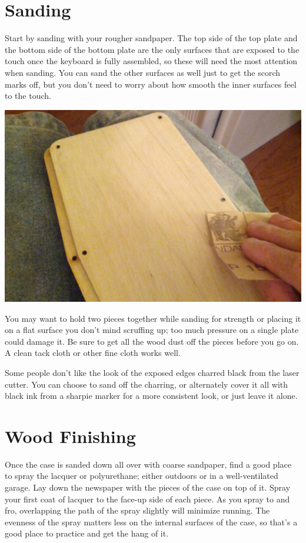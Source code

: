 \documentclass[landscape,twocolumn]{article}
\begin{document}
\section{Sanding}

Start by sanding with your rougher sandpaper. The top side of the
top plate and the bottom side of the bottom plate are the only
surfaces that are exposed to the touch once the keyboard is fully
assembled, so these will need the most attention when sanding. You can
sand the other surfaces as well just to get the scorch marks off, but
you don't need to worry about how smooth the inner surfaces feel to
the touch.

\vspace{1em}
\begin{center}
  \includegraphics[width=0.7\columnwidth]{sanding.jpg}
\end{center}
\vspace{1em}

You may want to hold two pieces together while sanding for strength or
placing it on a flat surface you don't mind scruffing up; too much
pressure on a single plate could damage it. Be sure to get all the
wood dust off the pieces before you go on. A clean tack cloth or other
fine cloth works well.

\vspace{1em}

Some people don't like the look of the exposed edges charred black
from the laser cutter. You can choose to sand off the charring, or
alternately cover it all with black ink from a sharpie marker for a
more consistent look, or just leave it alone.

\section{Wood Finishing}

Once the case is sanded down all over with coarse sandpaper, find a
good place to spray the lacquer or polyurethane; either outdoors or in
a well-ventilated garage. Lay down the newspaper with the pieces of
the case on top of it. Spray your first coat of lacquer to the face-up
side of each piece. As you spray to and fro, overlapping the path of
the spray slightly will minimize running. The evenness of the spray
matters less on the internal surfaces of the case, so that's a good
place to practice and get the hang of it.
\end{document}
